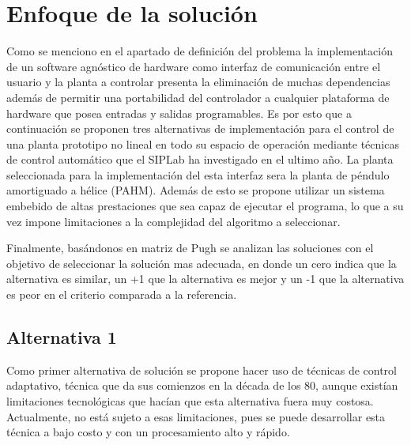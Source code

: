 \documentclass[12pt]{article}
\begin{document}



\section{Enfoque de la solución}

Como se menciono en el apartado de definición del problema la implementación de un software agnóstico de hardware como interfaz de comunicación entre el usuario y la planta a controlar presenta la eliminación de muchas dependencias además de permitir una portabilidad del controlador a cualquier plataforma de hardware que posea entradas y salidas programables. Es por esto que a continuación se proponen tres alternativas de implementación para el control de una planta prototipo no lineal en todo su espacio de operación mediante técnicas de control automático que el SIPLab ha investigado en el ultimo año. La planta seleccionada para la implementación del esta interfaz sera la planta de péndulo amortiguado a hélice (PAHM). Además de esto se propone utilizar un sistema embebido de altas prestaciones que sea capaz de ejecutar el programa, lo que a su vez impone limitaciones a la complejidad del algoritmo a seleccionar.

Finalmente, basándonos en matriz de Pugh se analizan las soluciones con el objetivo de seleccionar la solución mas adecuada, en donde un cero indica que la alternativa es similar, un +1 que la alternativa es mejor y un -1 que la alternativa es peor en el criterio comparada a la referencia.

\subsection{Alternativa 1}

Como primer alternativa de solución se propone hacer uso de técnicas de control adaptativo, técnica que da sus comienzos en la década de los 80, aunque existían limitaciones tecnológicas que hacían que esta alternativa fuera muy costosa. Actualmente,
no está sujeto a esas limitaciones, pues se puede desarrollar esta técnica a bajo costo y con un procesamiento alto y rápido\cite{15-tec}.
\end{document}
